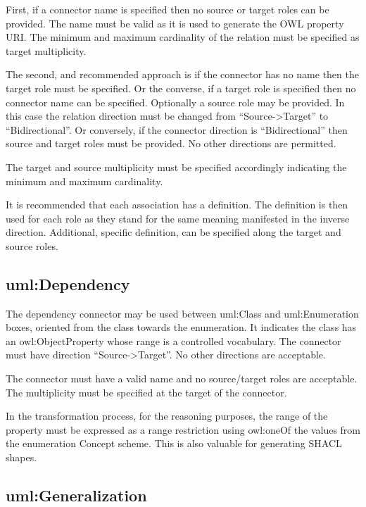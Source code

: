 	First, if a connector name is specified then no source or target roles can be provided. The name must be valid as it is used to generate the OWL property URI. The minimum and maximum cardinality of the relation must be specified as target multiplicity. 
	
	The second, and recommended approach is if the connector has no name then the target role must be specified. Or the converse, if a target role is specified then no connector name can be specified. Optionally a source role may be provided. In this case the relation direction must be changed from ``Source->Target'' to ``Bidirectional''. Or conversely, if the connector direction is ``Bidirectional'' then source and target roles must be provided. No other directions are permitted.
	
	The target and source multiplicity must be specified accordingly indicating the minimum and maximum cardinality. 
	
	It is recommended that each association has a definition. The definition is then used for each role as they stand for the same meaning manifested in the inverse direction. Additional, specific definition, can be specified along the target and source roles. 
	
	
	\subsection{uml:Dependency}
	\label{sec:dependency}
	
	The dependency connector may be used between uml:Class and uml:Enumeration boxes, oriented from the class towards the enumeration. It indicates the class has an owl:ObjectProperty whose range is a controlled vocabulary. 
	The connector must have direction ``Source->Target''. No other directions are acceptable. 
	
	The connector must have a valid name and no source/target roles are acceptable. The multiplicity must be specified at the target of the connector. 
	
	In the transformation process, for the reasoning purposes, the range of the property must be expressed as a range restriction using owl:oneOf the values from the enumeration Concept scheme. This is also valuable for generating SHACL shapes.
		
	\subsection{uml:Generalization}
	\label{sec:degenalization}
	
